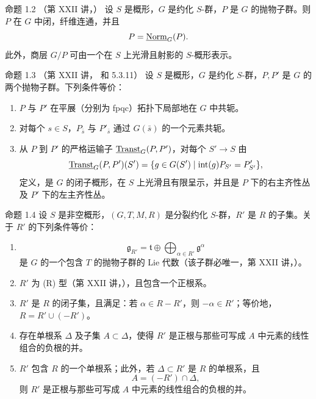 \begin{sgastatement}{命题 1.2 \textup{（第 XXII 讲，）}}
设 \(S\) 是概形，\(G\) 是约化 \(S\)-群，\(P\) 是 \(G\) 的抛物子群。则 \(P\) 在 \(G\) 中闭，纤维连通，并且
\[
  P=\underline{\operatorname{Norm}}_G(P).
\]
此外，商层 \(G/P\) 可由一个在 \(S\) 上光滑且射影的 \(S\)-概形表示。
\end{sgastatement}

\begin{sgastatement}{命题 1.3 \textup{（第 XXII 讲， 和 5.3.11）}}
设 \(S\) 是概形，\(G\) 是约化 \(S\)-群，\(P,P'\) 是 \(G\) 的两个抛物子群。下列条件等价：
\begin{enumerate}[label=\textup{(\roman*)}]
\item \(P\) 与 \(P'\) 在平展（分别为 fpqc）拓扑下局部地在 \(G\) 中共轭。
\item 对每个 \(s\in S\)，\(P_{\bar s}\) 与 \(P'_{\bar s}\) 通过 \(G(\bar s)\) 的一个元素共轭。
\item 从 \(P\) 到 \(P'\) 的严格运输子 \(\underline{\operatorname{Transt}}_G(P,P')\)，对每个 \(S'\to S\) 由
\[
 \underline{\operatorname{Transt}}_G(P,P')(S')
 =\{g\in G(S')\mid \operatorname{int}(g)P_{S'}=P'_{S'}\},
\]
定义，是 \(G\) 的闭子概形，在 \(S\) 上光滑且有限呈示，并且是 \(P\) 下的右主齐性丛及 \(P'\) 下的左主齐性丛。
\end{enumerate}
\end{sgastatement}

\begin{sgastatement}{命题 1.4}
设 \(S\) 是非空概形，\((G,T,M,R)\) 是分裂约化 \(S\)-群，\(R'\) 是 \(R\) 的子集。关于 \(R'\) 的下列条件等价：
\begin{enumerate}[label=\textup{(\roman*)}]
\item
\[
 \mathfrak g_{R'}=\mathfrak t\oplus
 \bigoplus_{\alpha\in R'}\mathfrak g^\alpha
\]
是 \(G\) 的一个包含 \(T\) 的抛物子群的 Lie 代数（该子群必唯一，第 XXII 讲，）。
\item \(R'\) 为 \textup{(R)} 型（第 XXII 讲，），且包含一个正根系。
\item \(R'\) 是 \(R\) 的闭子集，且满足：若 \(\alpha\in R-R'\)，则 \(-\alpha\in R'\)；等价地，\(R=R'\cup(-R')\)。
\item 存在单根系 \(\Delta\) 及子集 \(A\subset\Delta\)，使得 \(R'\) 是正根与那些可写成 \(A\) 中元素的线性组合的负根的并。
\item{} \(R'\) 包含 \(R\) 的一个单根系；此外，若 \(\Delta\subset R'\) 是 \(R\) 的单根系，且
\[
 A=(-R')\cap\Delta,
\]
则 \(R'\) 是正根与那些可写成 \(A\) 中元素的线性组合的负根的并。
\end{enumerate}
\end{sgastatement}

